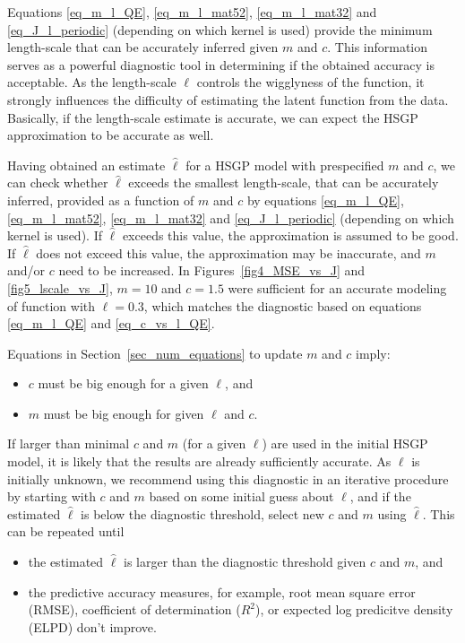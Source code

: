 Equations \eqref{eq_m_l_QE}, \eqref{eq_m_l_mat52}, \eqref{eq_m_l_mat32} and \eqref{eq_J_l_periodic} (depending on which kernel is used) provide the minimum length-scale that can be accurately inferred given $m$ and $c$. This information serves as a powerful diagnostic tool in determining if the obtained accuracy is acceptable. As the length-scale $\ell$ controls the wigglyness of the function, it strongly influences the difficulty of estimating the latent function from the data. Basically, if the length-scale estimate is accurate, we can expect the HSGP approximation to be accurate as well.

Having obtained an estimate $\hat{\ell}$ for a HSGP model with prespecified $m$ and $c$, we can check whether $\hat{\ell}$ exceeds the smallest length-scale, that can be accurately inferred, provided as a function of $m$ and $c$ by equations \eqref{eq_m_l_QE}, \eqref{eq_m_l_mat52}, \eqref{eq_m_l_mat32} and \eqref{eq_J_l_periodic} (depending on which kernel is used). If $\hat{\ell}$ exceeds this value, the approximation is assumed to be good. If $\hat{\ell}$ does not exceed this value, the approximation may be inaccurate, and $m$ and/or $c$ need to be increased. In Figures~\ref{fig4_MSE_vs_J} and \ref{fig5_lscale_vs_J}, $m = 10$ and $c = 1.5$ were sufficient for an accurate modeling of function with $\ell = 0.3$, which matches the diagnostic based on equations \eqref{eq_m_l_QE} and \eqref{eq_c_vs_l_QE}.

Equations in Section~\ref{sec_num_equations} to update $m$ and $c$ imply:
% 
\begin{itemize}
	\item $c$ must be big enough for a given $\ell$, and
	\item $m$ must be big enough for given $\ell$ and $c$. 
\end{itemize}
%
If larger than minimal $c$ and $m$ (for a given $\ell$) are used in the initial HSGP model, it is likely that the results are already sufficiently accurate. As $\ell$ is initially unknown, we recommend using this diagnostic in an iterative procedure by starting with $c$ and $m$ based on some initial guess about $\ell$, and if the estimated $\hat{\ell}$ is below the diagnostic threshold, select new $c$ and $m$ using $\hat{\ell}$. This can be repeated until
%
\begin{itemize}
\item the estimated $\hat{\ell}$ is larger than the diagnostic threshold given $c$ and $m$, and
\item the predictive accuracy measures, for example, root mean square error (RMSE), coefficient of determination ($R^2$), or expected log predicitve density (ELPD) don't improve.
\end{itemize}

